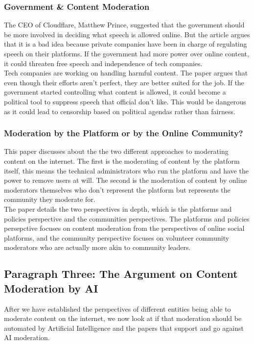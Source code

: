 \documentclass[a4paper]{article}
\begin{document}
\subsubsection{Government \& Content Moderation}
The CEO of Cloudflare, Matthew Prince, suggested that the government should be more involved in deciding what speech
is allowed online. But the article argues that it is a bad idea because private companies have been in charge of 
regulating speech on their platforms. If the government had more power over online content, it could threaten free
speech and independence of tech companies. \\

\noindent Tech companies are working on handling harmful content. The paper argues that even though their efforts 
aren't perfect, they are better suited for the job. If the government started controlling what content is allowed, 
it could become a political tool to suppress speech that official don't like. This would be dangerous as it could 
lead to censorship based on political agendas rather than fairness.

\subsubsection{Moderation by the Platform or by the Online Community?}
This paper discusses about the the two different approaches to moderating content on the internet. The first is the
moderating of content by the platform itself, this means the technical administrators who run the platform and have
the power to remove users at will. The second is the moderation of content by online moderators themselves who don't
represent the platform but represents the community they moderate for. \\

The paper details the two perspectives in depth, which is the platforms and policies perspective and the communities
perspectives. The platforms and policies persepctive focuses on content moderation from the perspectives of online
social platforms, and the community perspective focuses on volunteer community moderators who are actually more akin
to community leaders.

\subsection{Paragraph Three: The Argument on Content Moderation by AI}
After we have established the perspectives of different entities being able to moderate content on the internet, we 
now look at if that moderation should be automated by Artificial Intelligence and the papers that support and go 
against AI moderation. \\
\end{document}
